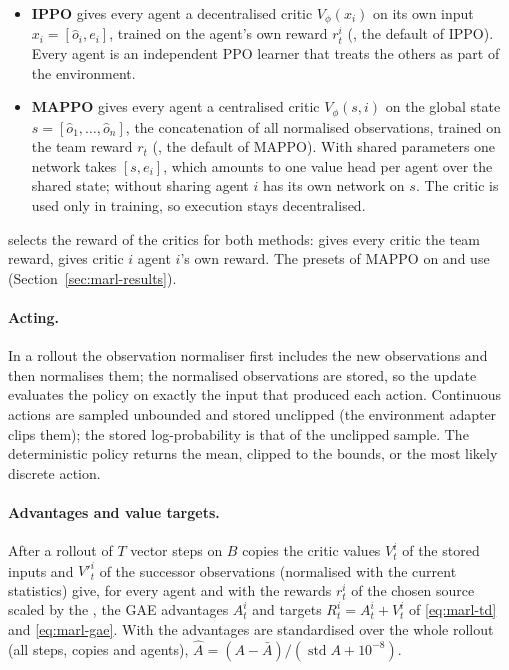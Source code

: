 \begin{itemize}
  \item \textbf{IPPO} gives every agent a decentralised critic
    $V_\phi(x_i)$ on its own input $x_i = [\hat o_i, e_i]$, trained on the
    agent's own reward $r^i_t$ (, the default of
    IPPO). Every agent is an independent PPO learner that treats the others as
    part of the environment.
  \item \textbf{MAPPO} gives every agent a centralised critic
    $V_\phi(s, i)$ on the global state $s = [\hat o_1, \dots, \hat o_n]$, the
    concatenation of all normalised observations, trained on the team reward
    $r_t$ (, the default of MAPPO). With shared
    parameters one network takes $[s, e_i]$, which amounts to one value head
    per agent over the shared state; without sharing agent $i$ has its own
    network on $s$. The critic is used only in training, so execution stays
    decentralised.
\end{itemize}

 selects the reward of the critics for both methods:
 gives every critic the team reward,  gives critic
$i$ agent $i$'s own reward. The presets of MAPPO on  and
 use  (Section~\ref{sec:marl-results}).

\paragraph{Acting.} In a rollout the observation normaliser first includes the
new observations and then normalises them; the normalised observations are
stored, so the update evaluates the policy on exactly the input that produced
each action. Continuous actions are sampled unbounded and stored unclipped
(the environment adapter clips them); the stored log-probability is that of
the unclipped sample. The deterministic policy returns the mean, clipped to
the bounds, or the most likely discrete action.

\paragraph{Advantages and value targets.} After a rollout of $T$ vector steps
on $B$ copies the critic values $V_t^i$ of the stored inputs and $V'^i_t$ of
the successor observations (normalised with the current statistics) give, for
every agent and with the rewards $r^i_t$ of the chosen source scaled by the
, the GAE advantages $A^i_t$ and targets $R^i_t = A^i_t +
V^i_t$ of \eqref{eq:marl-td} and \eqref{eq:marl-gae}. With
 the advantages are standardised over the whole
rollout (all steps, copies and agents), $\hat A = (A - \bar A)/(\operatorname{std}
A + 10^{-8})$.

